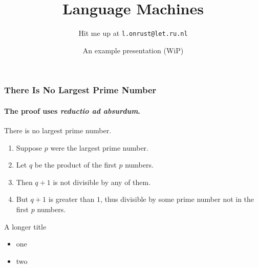\documentclass{beamer}
\title{Language Machines}
\date[2014]{An example presentation (WiP)}
\author[lama-fan]{Hit me up at \texttt{l.onrust@let.ru.nl}}
\begin{document}
\begin{frame}
\titlepage
\end{frame}


\begin{frame} 
\frametitle{There Is No Largest Prime Number} 
\framesubtitle{The proof uses \textit{reductio ad absurdum}.} 
\begin{theorem}
There is no largest prime number. \end{theorem} 
\begin{enumerate} 
\item<1-| alert@1> Suppose $p$ were the largest prime number. 
\item<2-> Let $q$ be the product of the first $p$ numbers. 
\item<3-> Then $q+1$ is not divisible by any of them. 
\item<1-> But $q + 1$ is greater than $1$, thus divisible by some prime
number not in the first $p$ numbers.
\end{enumerate}
\end{frame}

\begin{frame}{A longer title}
\begin{itemize}
\item one
\item two
\end{itemize}
\end{frame}
\end{document}
